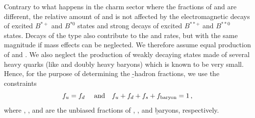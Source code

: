 Contrary to what happens in the charm sector where the fractions of 
 and  are different, the relative amount 
of \Bu and \Bd is not affected by the electromagnetic decays of 
excited $B^{*+}$ and $B^{*0}$ states and strong decays of excited 
$B^{**+}$ and $B^{**0}$ states. Decays of the type 
 also contribute to the \Bu and \Bd rates, 
but with the same magnitude if mass effects can be neglected.  
We therefore assume equal production of \Bu and \Bd. We also  
neglect the production of weakly decaying states
made of several heavy quarks (like \Bc and doubly heavy baryons) 
which is known to be very small. Hence, for the purpose of determining 
the \b-hadron fractions, we use the constraints
\begin{equation}
\fBu = \fBd ~~~~\mbox{and}~~~ \fBu + \fBd + \fBs + \fbb = 1 \,,
\labe{constraints}
\end{equation}
where \fBu, \fBd, \fBs and \fbb
are the unbiased fractions of \Bu, \Bd, \Bs and \b baryons, respectively.

